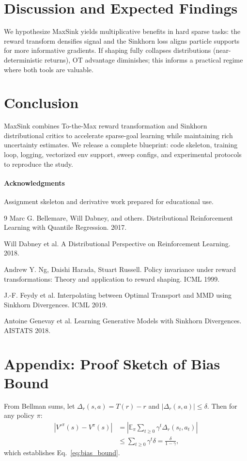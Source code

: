 \documentclass[10pt,twocolumn]{article}
\begin{document}
\section{Discussion and Expected Findings}
We hypothesize MaxSink yields multiplicative benefits in hard sparse tasks: the reward transform densifies signal and the Sinkhorn loss aligns particle supports for more informative gradients. If shaping fully collapses distributions (near-deterministic returns), OT advantage diminishes; this informs a practical regime where both tools are valuable.

\section{Conclusion}
MaxSink combines To-the-Max reward transformation and Sinkhorn distributional critics to accelerate sparse-goal learning while maintaining rich uncertainty estimates. We release a complete blueprint: code skeleton, training loop, logging, vectorized env support, sweep configs, and experimental protocols to reproduce the study.

\paragraph{Acknowledgments}
Assignment skeleton and derivative work prepared for educational use.


\begin{thebibliography}{9}
Marc G. Bellemare, Will Dabney, and others.
Distributional Reinforcement Learning with Quantile Regression. 2017.

Will Dabney et al. A Distributional Perspective on Reinforcement Learning. 2018.

Andrew Y. Ng, Daishi Harada, Stuart Russell. Policy invariance under reward transformations: Theory and application to reward shaping. ICML 1999.

J.-F. Feydy et al. Interpolating between Optimal Transport and MMD using Sinkhorn Divergences. ICML 2019.

Antoine Genevay et al. Learning Generative Models with Sinkhorn Divergences. AISTATS 2018.

\end{thebibliography}

\appendix
\section{Appendix: Proof Sketch of Bias Bound}
From Bellman sums, let $\Delta_r(s,a)=T(r)-r$ and $|\Delta_r(s,a)|\le\delta$. Then for any policy $\pi$:
\begin{align}
|V'^\pi(s)-V^\pi(s)| &= \left|\mathbb{E}_\pi\sum_{t\ge0}\gamma^t \Delta_r(s_t,a_t)\right|\nonumber\\
&\le \sum_{t\ge0}\gamma^t \delta = \frac{\delta}{1-\gamma},
\end{align}
which establishes Eq.~\ref{eq:bias_bound}.
\end{document}
